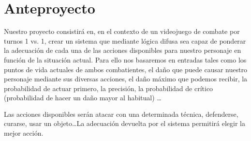 \section{Anteproyecto}

Nuestro proyecto consistirá en, en el contexto de un videojuego de combate por turnos 1 vs. 1, crear un sistema que mediante lógica difusa sea capaz de ponderar la adecuación de cada una de las acciones disponibles para nuestro personaje en función de la situación actual. Para ello nos basaremos en entradas tales como los puntos de vida actuales de ambos combatientes, el daño que puede causar nuestro personaje mediante  sus diversas acciones, el daño máximo que podemos recibir, la probabilidad de actuar primero, la precisión, la probabilidad de crítico (probabilidad de hacer un daño mayor al habitual) \dots

Las acciones disponibles serán atacar con una determinada técnica, defenderse, curarse, usar un objeto\dots La adecuación devuelta por el sistema permitirá elegir la mejor acción.